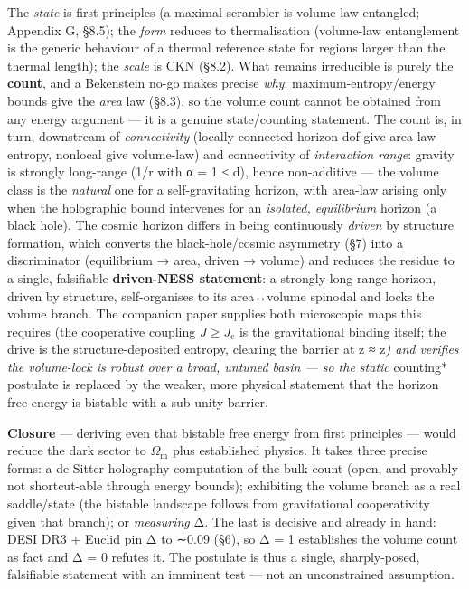 \documentclass[
  10pt,
]{article}
\begin{document}
The \emph{state} is first-principles (a maximal scrambler is
volume-law-entangled; Appendix G, §8.5); the \emph{form} reduces to
thermalisation (volume-law entanglement is the generic behaviour of a
thermal reference state for regions larger than the thermal length); the
\emph{scale} is CKN (§8.2). What remains irreducible is purely the
\textbf{count}, and a Bekenstein no-go makes precise \emph{why}:
maximum-entropy/energy bounds give the \emph{area} law (§8.3), so the
volume count cannot be obtained from any energy argument --- it is a
genuine state/counting statement. The count is, in turn, downstream of
\emph{connectivity} (locally-connected horizon dof give area-law
entropy, nonlocal give volume-law) and connectivity of \emph{interaction
range}: gravity is strongly long-range (1/r with α = 1 ≤ d), hence
non-additive --- the volume class is the \emph{natural} one for a
self-gravitating horizon, with area-law arising only when the
holographic bound intervenes for an \emph{isolated, equilibrium} horizon
(a black hole). The cosmic horizon differs in being continuously
\emph{driven} by structure formation, which converts the
black-hole/cosmic asymmetry (§7) into a discriminator (equilibrium →
area, driven → volume) and reduces the residue to a single, falsifiable
\textbf{driven-NESS statement}: a strongly-long-range horizon, driven by
structure, self-organises to its area↔volume spinodal and locks the
volume branch. The companion paper supplies both microscopic maps this
requires (the cooperative coupling \(J \geq  J_{\mathrm{c}}\) is the
gravitational binding itself; the drive is the structure-deposited
entropy, clearing the barrier at z ≈ z\emph{) and verifies the
volume-lock is robust over a broad, untuned basin --- so the static
}counting* postulate is replaced by the weaker, more physical statement
that the horizon free energy is bistable with a sub-unity barrier.

\textbf{Closure} --- deriving even that bistable free energy from first
principles --- would reduce the dark sector to \(\Omega _{\mathrm{m}}\)
plus established physics. It takes three precise forms: a de
Sitter-holography computation of the bulk count (open, and provably not
shortcut-able through energy bounds); exhibiting the volume branch as a
real saddle/state (the bistable landscape follows from gravitational
cooperativity given that branch); or \emph{measuring} Δ. The last is
decisive and already in hand: DESI DR3 + Euclid pin Δ to ∼0.09 (§6), so
Δ = 1 establishes the volume count as fact and Δ = 0 refutes it. The
postulate is thus a single, sharply-posed, falsifiable statement with an
imminent test --- not an unconstrained assumption.
\end{document}
